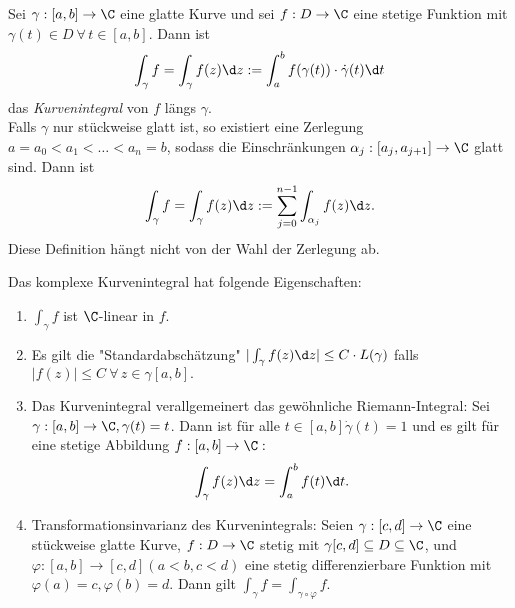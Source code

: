 		\begin{defn}[Kurvenintegral]
			Sei $ \gamma: [a,b] \to \C $ eine glatte Kurve und sei $ f: D \to \C $ eine stetige Funktion mit $ \gamma(t) \in D \ \forall\, t \in [a,b] $. Dann ist 
			\[ \int_\gamma f = \int_\gamma f(z) \d z := \int_{a}^{b} f(\gamma(t)) \cdot \dot{\gamma}(t) \d t \]	
			das \emph{Kurvenintegral} von $f$ längs $\gamma$.\\
			Falls $\gamma$ nur stückweise glatt ist, so existiert eine Zerlegung $ a=a_0 < a_1 < \dots < a_n=b $, sodass die Einschränkungen $ \alpha_j : [a_j,a_{j+1}] \to \C $ glatt sind. Dann ist 
			\[ \int_\gamma f = \int_\gamma f(z) \d z := \sum_{j=0}^{n-1} \int_{\alpha_j} f(z) \d z. \]
			Diese Definition hängt nicht von der Wahl der Zerlegung ab.
		\end{defn}
		
		\begin{prop}
			Das komplexe Kurvenintegral hat folgende Eigenschaften:
			\begin{enumerate}
				\item $ \int_\gamma f $ ist $\C$-linear in $f$.
				\item Es gilt die "Standardabschätzung" $ |\int_\gamma f(z) \d z| \leq C \cdot L(\gamma) $ falls $ |f(z)| \leq C \ \forall\, z \in \gamma[a,b]. $
				\item Das Kurvenintegral verallgemeinert das gewöhnliche Riemann-Integral: Sei $ \gamma: [a,b] \to \C, \gamma(t) = t $. Dann ist für alle $ t \in [a,b] \dot{\gamma}(t) = 1 $ und es gilt für eine stetige Abbildung $ f: [a,b] \to \C:$
				$$ \int_\gamma f(z) \d z = \int_{a}^b f(t) \d t. $$
				\item Transformationsinvarianz des Kurvenintegrals: Seien $ \gamma: [c,d] \to \C $ eine stückweise glatte Kurve, $ f: D \to \C $ stetig mit $ \gamma[c,d] \subseteq D \subseteq \C $, und $ \varphi: [a,b] \to [c,d] (a<b,c<d) $ eine stetig differenzierbare Funktion mit $ \varphi(a) = c, \varphi(b) = d $. Dann gilt $ \int_\gamma f = \int_{\gamma \circ \varphi} f $.
			\end{enumerate}
		\end{prop}